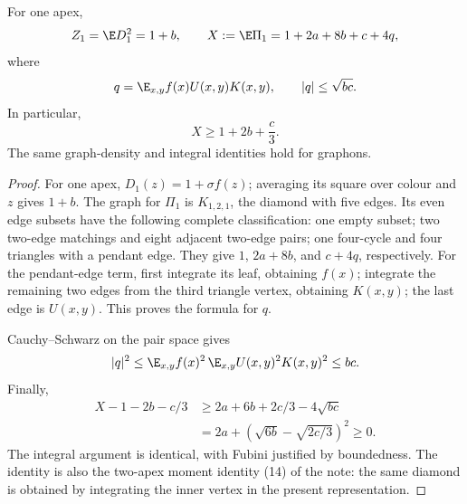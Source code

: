 \begin{lemma}
\label{lem:diamond}
\proved For one apex,
\[
 Z_1=\E D_1^2=1+b,\qquad
 X:=\E\Pi_1=1+2a+8b+c+4q,
\]
where
\[
 q=\E_{x,y}f(x)U(x,y)K(x,y),\qquad |q|\le\sqrt{bc}.
\]
In particular,
\[
 X\ge1+2b+\frac c3.
\]
The same graph-density and integral identities hold for graphons.
\end{lemma}
\begin{proof}
For one apex, $D_1(z)=1+\sigma f(z)$; averaging its square over colour and $z$ gives $1+b$.
The graph for $\Pi_1$ is $K_{1,2,1}$, the diamond with five edges.  Its even edge subsets
have the following complete classification: one empty subset; two two-edge matchings and
eight adjacent two-edge pairs; one four-cycle and four triangles with a pendant edge.
They give $1$, $2a+8b$, and $c+4q$, respectively.  For the pendant-edge term, first integrate
its leaf, obtaining $f(x)$; integrate the remaining two edges from the third triangle vertex,
obtaining $K(x,y)$; the last edge is $U(x,y)$.  This proves the formula for $q$.

Cauchy--Schwarz on the pair space gives
\[
 |q|^2\le\E_{x,y}f(x)^2\,\E_{x,y}U(x,y)^2K(x,y)^2\le b c.
\]
Finally,
\begin{align*}
 X-1-2b-c/3
 &\ge2a+6b+2c/3-4\sqrt{bc}\\
 &=2a+\left(\sqrt{6b}-\sqrt{2c/3}\right)^2\ge0.
\end{align*}
The integral argument is identical, with Fubini justified by boundedness.  The identity is
also the two-apex moment identity (14) of the note: the same diamond is obtained by
integrating the inner vertex in the present representation.
\end{proof}

